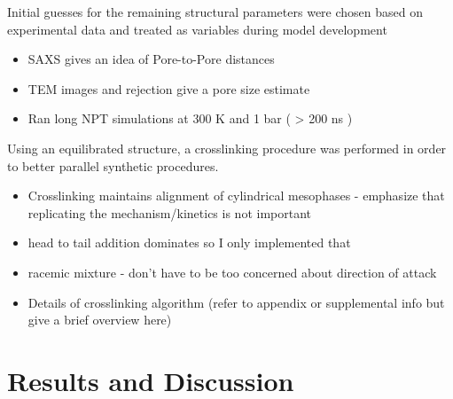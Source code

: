 \documentclass{article}
\begin{document}
	\noindent Initial guesses for the remaining structural parameters were chosen based on experimental data and treated as variables during model development 
	\begin{itemize}
		\item SAXS gives an idea of Pore-to-Pore distances
		\item TEM images and rejection give a pore size estimate
		\item Ran long NPT simulations at 300 K and 1 bar ( > 200 ns )
	\end{itemize}
	
	Using an equilibrated structure, a crosslinking procedure was performed in order to better parallel synthetic procedures. 
	\begin{itemize}
		\item Crosslinking maintains alignment of cylindrical mesophases - emphasize that replicating the mechanism/kinetics is not important 
		\item head to tail addition dominates so I only implemented that
		\item racemic mixture - don't have to be too concerned about direction of attack 
		\item Details of crosslinking algorithm (refer to appendix or supplemental info but give a brief overview here)
	\end{itemize}  
	
	\section{Results and Discussion}
\end{document}
